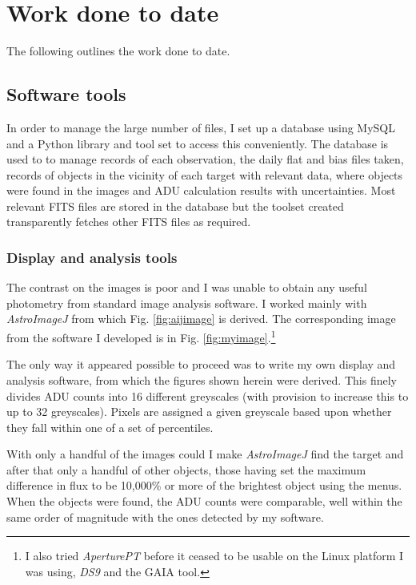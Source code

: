 \section{Work done to date}
\protect\label{section:workdonetodate}

The following outlines the work done to date.

\subsection{Software tools}
\protect\label{section:softwaretools}

In order to manage the large number of files, I set up a database using MySQL
and a Python library and tool set to access this conveniently. The database is
used to to manage records of each observation, the daily flat and bias files
taken, records of objects in the vicinity of each target with relevant data,
where objects were found in the images and ADU calculation results with
uncertainties. Most relevant FITS files are stored in the database but the
toolset created transparently fetches other FITS files as required.

\subsubsection{Display and analysis tools}
\protect\label{section:displayanaltools}

The contrast on the images is poor and I was unable to obtain any useful
photometry from standard image analysis software. I worked mainly with 
\textit{AstroImageJ} from which Fig. \ref{fig:aijimage} is derived. The
corresponding image from the software I developed is in Fig.
\ref{fig:myimage}.\footnote{I also tried \textit{AperturePT} before it ceased to
be usable on the Linux platform I was using, \textit{DS9} and the GAIA tool.}

The only way it appeared possible to proceed was to write my own display and
analysis software, from which the figures shown herein were derived. This finely
divides ADU counts into 16 different greyscales (with provision to increase
this to up to 32 greyscales). Pixels are assigned a given greyscale based upon
whether they fall within one of a set of percentiles.

With only a handful of the images could I make \textit{AstroImageJ} find the
target and after that only a handful of other objects, those having set the maximum
difference in flux to be 10,000\% or more of the brightest object using the
menus. When the objects were found, the ADU counts were comparable, well within
the same order of magnitude with the ones detected by my software.

